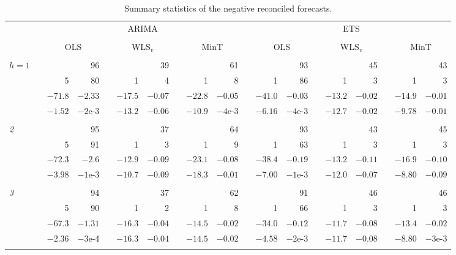\documentclass[twocolumn]{svjour3}
\begin{document}
\begin{table*}[!htbp]
\centering
\fontsize{9}{12}\rm\tabcolsep=0.16cm
\caption{Summary statistics of the negative reconciled forecasts.}
\label{tbl:summaryneg}
\begin{threeparttable}
	\begin{tabular}{lrrrrrrrrrrrrrrrrrr}
	\toprule
		& & \multicolumn{8}{c}{ARIMA} & & \multicolumn{8}{c}{ETS} \\
		 \cline{3-10} \cline{12-19} \\[-0.3cm]
		&  & \multicolumn{2}{c}{OLS}  & & \multicolumn{2}{c}{WLS$_{v}$} & & \multicolumn{2}{c}{MinT} & & \multicolumn{2}{c}{OLS}  & & \multicolumn{2}{c}{WLS$_{v}$} & & \multicolumn{2}{c}{MinT} \\
		\cline{3-4} \cline{6-7} \cline{9-10} \cline{12-13} \cline{15-16} \cline{18-19}\\[-0.3cm]
		$h = 1$ & & & 96 & & & 39 & & & 61 & & & 93 & & & 45 & & & 43 \\
				& & 5 & 80 & & 1 & 4 & & 1 & 8 & & 1 & 86 & & 1 & 3 & & 1 & 3 \\
				& & $-71.8$ & $-2.33$ & & $-17.5$ & $-0.07$ & & $-22.8$ & $-0.05$ & & $-41.0$ & $-0.03$ & & $-13.2$ & $-0.02$ & & $-14.9$ & $-0.01$ \\
				& & $-1.52$ & $-2$e-3 & & $-13.2$ & $-0.06$ &  & $-10.9$ & $-4$e-3 & & $-6.16$ & $-4$e-3 & & $-12.7$ & $-0.02$ & & $-9.78$ & $-0.01$ \\ \\[-0.3cm]
		{\it 2} & & & 95 & & & 37 & & & 64 & & & 93 & & & 43 & & & 45 \\
				& & 5 & 91 & & 1 & 3 & & 1 & 9 & & 1 & 63 & & 1 & 3 & & 1 & 3\\
				& & $-72.3$ & $-2.6$ & & $-12.9$ & $-0.09$ & & $-23.1$ & $-0.08$ & & $-38.4$ & $-0.19$ & & $-13.2$ & $-0.11$ & & $-16.9$ & $-0.10$\\
				& & $-3.98$ & $-1$e-3 & & $-10.7$ & $-0.09$ & & $-18.3$ & $-0.01$ & & $-7.00$ & $-1$e-3 & & $-12.0$ & $-0.07$ & & $-8.80$ & $-0.09$ \\ \\[-0.3cm]
		{\it 3} & & & 94 & & & 37 & & & 62 &  & & 91 & & & 46 & & & 46 \\
				& & 5 & 90 & & 1 & 2 & & 1 & 8 &  & 1 & 66 & & 1 & 3 & & 1 & 3\\
				& & $-67.3$ & $-1.31$ & & $-16.3$ & $-0.04$ & & $-14.5$ & $-0.02$ &  & $-34.0$ & $-0.12$ & & $-11.7$ & $-0.08$ & & $-13.4$ & $-0.02$\\
				& & $-2.36$ & $-3$e-4 & & $-16.3$ & $-0.04$ & & $-14.5$ & $-0.02$ &  & $-4.58$ & $-2$e-3 & & $-11.7$ & $-0.08$ & & $-8.80$ & $-3$e-3 \\ \\[-0.3cm]

\end{tabular}
\end{threeparttable}
\end{table*}
\end{document}
